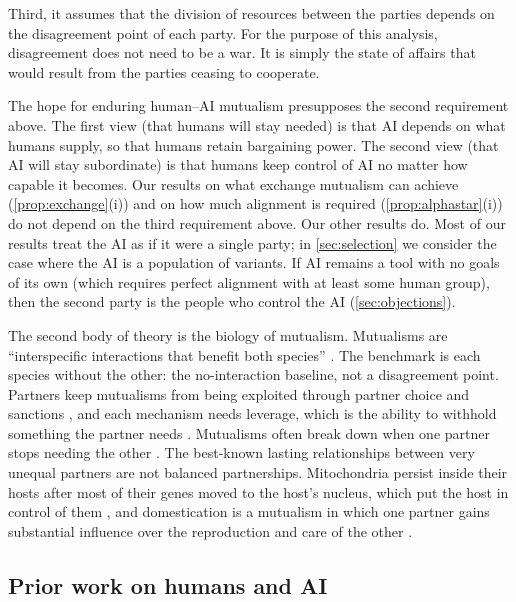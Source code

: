 \documentclass[article, 11pt, reqno]{amsart}
\theoremstyle{named}
\theoremstyle{plain}
\begin{document}
Third, it assumes that the division of resources between the parties depends on the disagreement point of each party. For the purpose of this analysis, disagreement does not need to be a war. It is simply the state of affairs that would result from the parties ceasing to cooperate.

The hope for enduring human--AI mutualism presupposes the second requirement above. The first view (that humans will stay needed) is that AI depends on what humans supply, so that humans retain bargaining power. The second view (that AI will stay subordinate) is that humans keep control of AI no matter how capable it becomes. Our results on what exchange mutualism can achieve (\cref{prop:exchange}(i)) and on how much alignment is required (\cref{prop:alphastar}(i)) do not depend on the third requirement above. Our other results do. Most of our results treat the AI as if it were a single party; in \cref{sec:selection} we consider the case where the AI is a population of variants. If AI remains a tool with no goals of its own (which requires perfect alignment with at least some human group), then the second party is the people who control the AI (\cref{sec:objections}).

The second body of theory is the biology of mutualism. Mutualisms are ``interspecific interactions that benefit both species'' \citep[31]{Bronstein1994}. The benchmark is each species without the other: the no-interaction baseline, not a disagreement point. Partners keep mutualisms from being exploited through partner choice and sanctions \citep{BullRice1991, Sachs2004}, and each mechanism needs leverage, which is the ability to withhold something the partner needs \citep{Kiers2003}. Mutualisms often break down when one partner stops needing the other \citep{SachsSimms2006}. The best-known lasting relationships between very unequal partners are not balanced partnerships. Mitochondria persist inside their hosts after most of their genes moved to the host's nucleus, which put the host in control of them \citep{Timmis2004}, and domestication is a mutualism in which one partner gains substantial influence over the reproduction and care of the other \citep{Zeder2015}.

\subsection{Prior work on humans and AI}\label{sec:prior}
\end{document}
